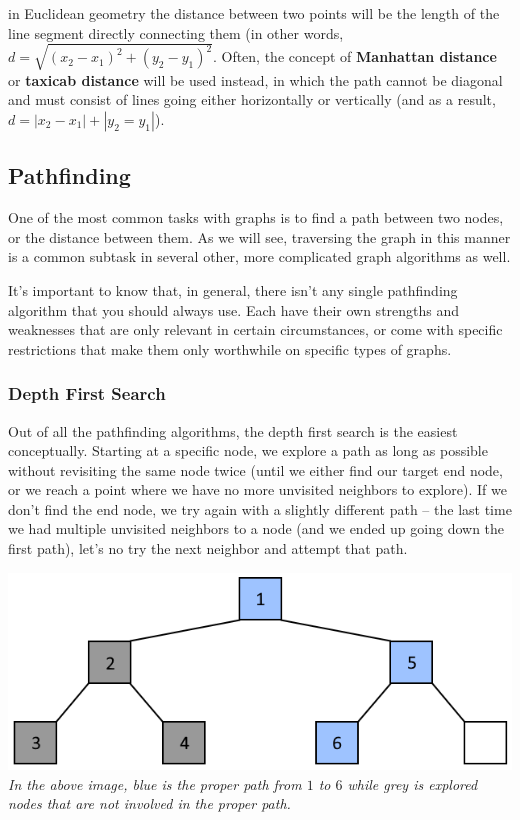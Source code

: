 in Euclidean geometry the distance between two points will be the length of the line segment directly connecting them (in other words, $d = \sqrt{(x_2 - x_1)^2 + (y_2 - y_1)^2}$. Often, the concept of \textbf{Manhattan distance} or \textbf{taxicab distance} will be used instead, in which the path cannot be diagonal and must consist of lines going either horizontally or vertically (and as a result, $d = |x_2 - x_1| + |y_2 = y_1|$).

\subsection{Pathfinding}

One of the most common tasks with graphs is to find a path between two nodes, or the distance between them. As we will see, traversing the graph in this manner is a common subtask in several other, more complicated graph algorithms as well.

It's important to know that, in general, there isn't any single pathfinding algorithm that you should always use. Each have their own strengths and weaknesses that are only relevant in certain circumstances, or come with specific restrictions that make them only worthwhile on specific types of graphs.

\subsubsection{Depth First Search}

Out of all the pathfinding algorithms, the depth first search is the easiest conceptually. Starting at a specific node, we explore a path as long as possible without revisiting the same node twice (until we either find our target end node, or we reach a point where we have no more unvisited neighbors to explore). If we don't find the end node, we try again with a slightly different path -- the last time we had multiple unvisited neighbors to a node (and we ended up going down the first path), let's no try the next neighbor and attempt that path.

{\centering \includegraphics[width=\textwidth]{images/graph/dfs.png}}
\textit{In the above image, blue is the proper path from $1$ to $6$ while grey is explored nodes that are not involved in the proper path.}

